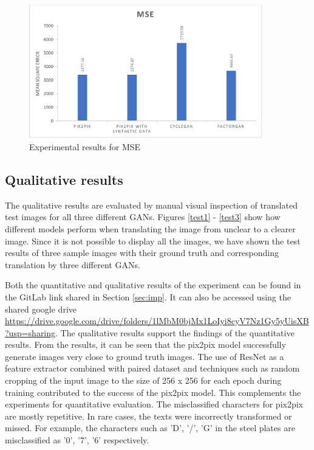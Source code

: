 \begin{figure}[H]
\centering
\includegraphics[width=4in]{images/mse.eps}
\caption{Experimental results for MSE}
\label{fig:mse}
\end{figure}

\subsection{Qualitative results}
The qualitative results are evaluated by manual visual inspection of translated test images for all three different GANs. Figures \ref{test1} - \ref{test3} show how different models perform when translating the image from unclear to a clearer image. Since it is not possible to display all the images, we have shown the test results of three sample images with their ground truth and corresponding translation by three different GANs. 
\newline	

	
	Both the quantitative and qualitative results of the experiment can be found in the GitLab link shared in Section \ref{sec:imp}.  It can also be accessed using the shared google drive \url{https://drive.google.com/drive/folders/1lMbM0bjMx1LoIyi8cyV7Nz1Gy5yUisXB?usp=sharing}. The qualitative results support the findings of the quantitative results. From the results, it can be seen that the pix2pix model successfully generate images very close to ground truth images. The use of ResNet as a feature extractor combined with paired dataset and techniques such as random cropping of the input image to the size of 256 x 256 for each epoch during training contributed to the success of the pix2pix model. This complements the experiments for quantitative evaluation. The misclassified characters for pix2pix are mostly repetitive. In rare cases, the texts were incorrectly transformed or missed. For example, the characters such as 'D', '/', 'G' in the steel plates are misclassified as '0', '7', '6' respectively.
\newline	
	

